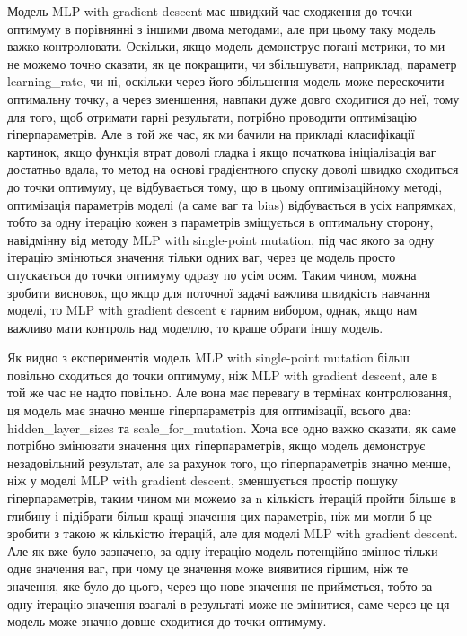 Модель MLP with gradient descent має швидкий час сходження до точки оптимуму в порівнянні з іншими двома методами, але при цьому таку модель важко контролювати. Оскільки, якщо модель демонструє погані метрики, то ми не можемо точно сказати, як це покращити, чи збільшувати, наприклад, параметр learning\_rate, чи ні, оскільки через його збільшення модель може перескочити оптимальну точку, а через зменшення, навпаки дуже довго сходитися до неї, тому для того, щоб отримати гарні результати, потрібно проводити оптимізацію гіперпараметрів. Але в той же час, як ми бачили на прикладі класифікації картинок, якщо функція втрат доволі гладка і якщо початкова ініціалізація ваг достатньо вдала, то метод на основі градієнтного спуску доволі швидко сходиться до точки оптимуму, це відбувається тому, що в цьому оптимізаційному методі, оптимізація параметрів моделі (а саме ваг та bias) відбувається в усіх напрямках, тобто за одну ітерацію кожен з параметрів зміщується в оптимальну сторону, навідмінну від методу MLP with single-point mutation, під час якого за одну ітерацію змінються значення тільки одних ваг, через це модель просто спускається до точки оптимуму одразу по усім осям. Таким чином, можна зробити висновок, що якщо для поточної задачі важлива швидкість навчання моделі, то MLP with gradient descent є гарним вибором, однак, якщо нам важливо мати контроль над моделлю, то краще обрати іншу модель.

Як видно з експериментів модель MLP with single-point mutation більш повільно сходиться до точки оптимуму, ніж MLP with gradient descent, але в той же час не надто повільно. Але вона має перевагу в термінах контролювання, ця модель має значно менше гіперпараметрів для оптимізації, всього два: hidden\_layer\_sizes та scale\_for\_mutation. Хоча все одно важко сказати, як саме потрібно змінювати значення цих гіперпараметрів, якщо модель демонструє незадовільний результат, але за рахунок того, що гіперпараметрів значно менше, ніж у моделі MLP with gradient descent, зменшується простір пошуку гіперпараметрів, таким чином ми можемо за n кількість ітерацій пройти більше в глибину і підібрати більш кращі значення цих параметрів, ніж ми могли б це зробити з такою ж кількістю ітерацій, але для моделі MLP with gradient descent. Але як вже було зазначено, за одну ітерацію модель потенційно змінює тільки одне значення ваг, при чому це значення може виявитися гіршим, ніж те значення, яке було до цього, через що нове значення не прийметься, тобто за одну ітерацію значення взагалі в результаті може не змінитися, саме через це ця модель може значно довше сходитися до точки оптимуму.

